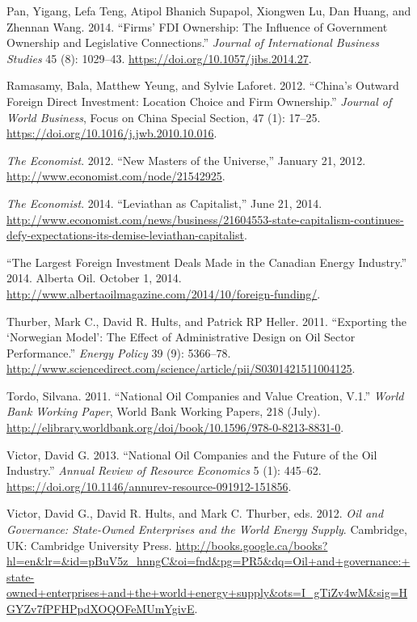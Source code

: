 \documentclass[11pt,]{book}
\begin{document}
\leavevmode\hypertarget{ref-pan_firms_2014}{}%
Pan, Yigang, Lefa Teng, Atipol Bhanich Supapol, Xiongwen Lu, Dan Huang, and Zhennan Wang. 2014. ``Firms' FDI Ownership: The Influence of Government Ownership and Legislative Connections.'' \emph{Journal of International Business Studies} 45 (8): 1029--43. \url{https://doi.org/10.1057/jibs.2014.27}.

\leavevmode\hypertarget{ref-ramasamy_chinas_2012}{}%
Ramasamy, Bala, Matthew Yeung, and Sylvie Laforet. 2012. ``China's Outward Foreign Direct Investment: Location Choice and Firm Ownership.'' \emph{Journal of World Business}, Focus on China Special Section, 47 (1): 17--25. \url{https://doi.org/10.1016/j.jwb.2010.10.016}.

\leavevmode\hypertarget{ref-noauthor_new_2012}{}%
\emph{The Economist}. 2012. ``New Masters of the Universe,'' January 21, 2012. \url{http://www.economist.com/node/21542925}.

\leavevmode\hypertarget{ref-noauthor_leviathan_2014}{}%
\emph{The Economist}. 2014. ``Leviathan as Capitalist,'' June 21, 2014. \url{http://www.economist.com/news/business/21604553-state-capitalism-continues-defy-expectations-its-demise-leviathan-capitalist}.

\leavevmode\hypertarget{ref-noauthor_largest_2014}{}%
``The Largest Foreign Investment Deals Made in the Canadian Energy Industry.'' 2014. Alberta Oil. October 1, 2014. \url{http://www.albertaoilmagazine.com/2014/10/foreign-funding/}.

\leavevmode\hypertarget{ref-thurber_exporting_2011}{}%
Thurber, Mark C., David R. Hults, and Patrick RP Heller. 2011. ``Exporting the `Norwegian Model': The Effect of Administrative Design on Oil Sector Performance.'' \emph{Energy Policy} 39 (9): 5366--78. \url{http://www.sciencedirect.com/science/article/pii/S0301421511004125}.

\leavevmode\hypertarget{ref-tordo_national_2011}{}%
Tordo, Silvana. 2011. ``National Oil Companies and Value Creation, V.1.'' \emph{World Bank Working Paper}, World Bank Working Papers, 218 (July). \url{http://elibrary.worldbank.org/doi/book/10.1596/978-0-8213-8831-0}.

\leavevmode\hypertarget{ref-victor_national_2013}{}%
Victor, David G. 2013. ``National Oil Companies and the Future of the Oil Industry.'' \emph{Annual Review of Resource Economics} 5 (1): 445--62. \url{https://doi.org/10.1146/annurev-resource-091912-151856}.

\leavevmode\hypertarget{ref-victor_oil_2012}{}%
Victor, David G., David R. Hults, and Mark C. Thurber, eds. 2012. \emph{Oil and Governance: State-Owned Enterprises and the World Energy Supply}. Cambridge, UK: Cambridge University Press. \url{http://books.google.ca/books?hl=en\&lr=\&id=pBuV5z_hnngC\&oi=fnd\&pg=PR5\&dq=Oil+and+governance:+state-owned+enterprises+and+the+world+energy+supply\&ots=I_gTiZv4wM\&sig=HGYZv7fPFHPpdXOQOFeMUmYgivE}.
\end{document}
